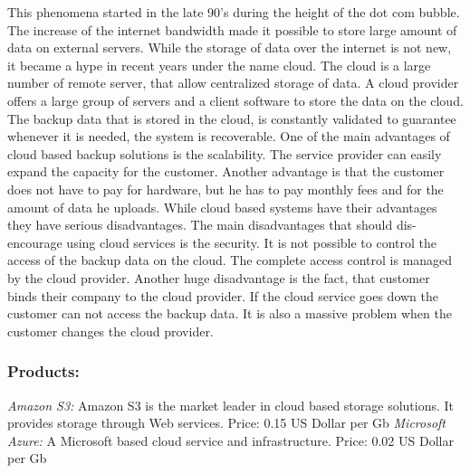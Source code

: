 \documentclass[12pt]{article}
\begin{document}
This phenomena started in the late 90's during the height of the dot com bubble. The increase of the internet bandwidth made it possible to store large amount of data on external servers. While the storage of data over the internet is not new, it became a hype in recent years under the name cloud.
\newline
\newline
The cloud is a large number of remote server, that allow centralized storage of data.  A cloud provider offers a large group of servers and a client software to store the data on the cloud.  The backup data that is stored in the cloud, is constantly validated to guarantee whenever it is needed, the system is recoverable.  One of the main advantages of cloud based backup solutions is the scalability. The service provider can easily expand the capacity for the customer. Another advantage is that the customer does not have to pay for hardware, but he has to pay monthly fees and for the amount of data he uploads.
\newline
\newline
While cloud based systems have their advantages they have serious disadvantages. The main disadvantages that should dis-encourage using cloud services is the security.  It is not possible to control the access of the backup data on the cloud. The complete access control is managed by the cloud provider. Another huge disadvantage is the fact, that customer binds their company to the cloud provider. If the cloud service goes down the customer can not access the backup data. It is also a massive problem when the customer changes the cloud provider.

\subsubsection{Products:}

\emph{Amazon S3:}
\newline
Amazon S3 is the market leader in cloud based storage solutions. It provides storage through Web services.
\newline
\newline
Price: 0.15 US Dollar per Gb
\newline
\newline
\emph{Microsoft Azure:}
\newline
A Microsoft based cloud service and infrastructure.
\newline
\newline
Price: 0.02 US Dollar per Gb 
\end{document}
